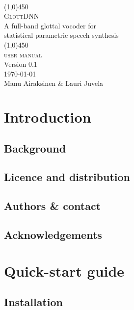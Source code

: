 \documentclass[a4paper, 11pt]{article}
\begin{document}
\begin{titlepage}
\begin{center}
~\\[3cm]
\line(1,0){450} \\[1cm]
\Huge{\textsf{\textsc{GlottDNN}}}\\[1cm]
\huge{\textmd{A full-band glottal vocoder for\\
	 statistical parametric speech synthesis}}\\[0.5cm]
\line(1,0){450} \\[2cm] 
\Huge{\textsc{user manual}}\\
\huge{Version 0.1}\\[2cm] 

\Large{\today \\
      Manu Airaksinen \& Lauri Juvela\\}
	
\end{center}
\end{titlepage}

\tableofcontents

\newpage

\section{Introduction}

\subsection{Background}

\subsection{Licence and distribution}


\subsection{Authors \& contact}

\subsection{Acknowledgements}

\section{Quick-start guide}

\subsection{Installation}
\end{document}
